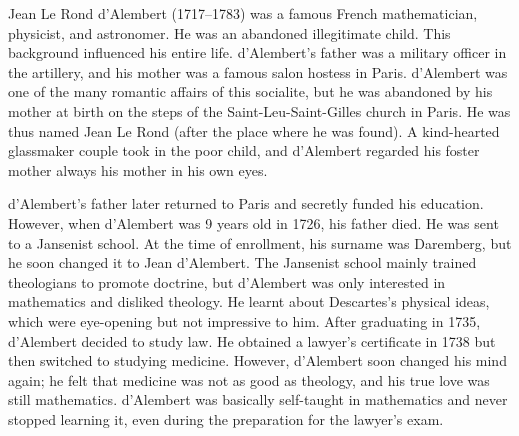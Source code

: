 \documentclass[b5paper]{article}
\begin{document}
\begin{mdframed}
Jean Le Rond d'Alembert (1717–1783) was a famous French mathematician, physicist, and astronomer. He was an abandoned illegitimate child. This background influenced his entire life. d'Alembert's father was a military officer in the artillery, and his mother was a famous salon hostess in Paris. d'Alembert was one of the many romantic affairs of this socialite, but he was abandoned by his mother at birth on the steps of the Saint-Leu-Saint-Gilles church in Paris. He was thus named Jean Le Rond (after the place where he was found). A kind-hearted glassmaker couple took in the poor child, and d'Alembert regarded his foster mother always his mother in his own eyes.

d'Alembert's father later returned to Paris and secretly funded his education. However, when d'Alembert was 9 years old in 1726, his father died. He was sent to a Jansenist school. At the time of enrollment, his surname was Daremberg, but he soon changed it to Jean d'Alembert. The Jansenist school mainly trained theologians to promote doctrine, but d'Alembert was only interested in mathematics and disliked theology. He learnt about Descartes's physical ideas, which were eye-opening but not impressive to him. After graduating in 1735, d'Alembert decided to study law. He obtained a lawyer's certificate in 1738 but then switched to studying medicine. However, d'Alembert soon changed his mind again; he felt that medicine was not as good as theology, and his true love was still mathematics. d'Alembert was basically self-taught in mathematics and never stopped learning it, even during the preparation for the lawyer's exam.


\end{mdframed}
\end{document}
